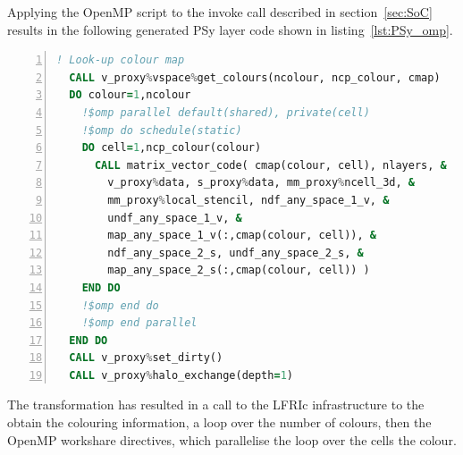 \documentclass[review,times]{elsarticle}
\begin{document}
%
%
%
%

Applying the OpenMP script to the invoke call described in
section~\ref{sec:SoC} results in the following generated PSy layer
code shown in listing~\ref{lst:PSy_omp}. 
\begin{lstlisting}[language=Fortran, numbers=left,caption={Code 
fragment of the generated PSy layer},label={lst:PSy_omp}]
  ! Look-up colour map
  CALL v_proxy%vspace%get_colours(ncolour, ncp_colour, cmap)
  DO colour=1,ncolour
    !$omp parallel default(shared), private(cell)
    !$omp do schedule(static)
    DO cell=1,ncp_colour(colour)
      CALL matrix_vector_code( cmap(colour, cell), nlayers, &
        v_proxy%data, s_proxy%data, mm_proxy%ncell_3d, & 
        mm_proxy%local_stencil, ndf_any_space_1_v, &
        undf_any_space_1_v, &
        map_any_space_1_v(:,cmap(colour, cell)), &
        ndf_any_space_2_s, undf_any_space_2_s, &
        map_any_space_2_s(:,cmap(colour, cell)) )
    END DO 
    !$omp end do
    !$omp end parallel
  END DO 
  CALL v_proxy%set_dirty()
  CALL v_proxy%halo_exchange(depth=1)
\end{lstlisting}
The transformation has resulted in a call to the LFRIc infrastructure
to the obtain the colouring information, a loop over the number of
colours, then the OpenMP workshare directives, which parallelise the
loop over the cells the colour.
\end{document}
